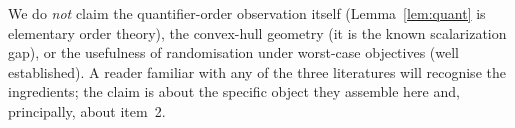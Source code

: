 We do \emph{not} claim the quantifier-order observation itself (Lemma~\ref{lem:quant} is elementary order theory), the convex-hull geometry (it is the known scalarization gap), or the usefulness of randomisation under worst-case objectives (well established). A reader familiar with any of the three literatures will recognise the ingredients; the claim is about the specific object they assemble here and, principally, about item~2.

